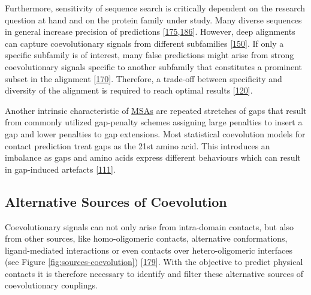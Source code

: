 \documentclass[11pt,a4paper,twoside]{book}
\theoremstyle{definition}
\theoremstyle{definition}
\theoremstyle{remark}
\begin{document}
Furthermore, sensitivity of sequence search is critically dependent on
the research question at hand and on the protein family under study.
Many diverse sequences in general increase precision of predictions
{[}\protect\hyperlink{ref-Ashkenazy2009}{175},\protect\hyperlink{ref-Avila-Herrera2015a}{186}{]}.
However, deep alignments can capture coevolutionary signals from
different subfamilies {[}\protect\hyperlink{ref-Uguzzoni2017}{150}{]}.
If only a specific subfamily is of interest, many false predictions
might arise from strong coevolutionary signals specific to another
subfamily that constitutes a prominent subset in the alignment
{[}\protect\hyperlink{ref-Franceus2016}{170}{]}. Therefore, a trade-off
between specificity and diversity of the alignment is required to reach
optimal results {[}\protect\hyperlink{ref-Hopf2012}{120}{]}.

Another intrinsic characteristic of \protect\hyperlink{abbrev}{MSAs} are
repeated stretches of gaps that result from commonly utilized
gap-penalty schemes assigning large penalties to insert a gap and lower
penalties to gap extensions. Most statistical coevolution models for
contact prediction treat gaps as the 21st amino acid. This introduces an
imbalance as gaps and amino acids express different behaviours which can
result in gap-induced artefacts
{[}\protect\hyperlink{ref-Feinauer2014}{111}{]}.

\subsection{Alternative Sources of
Coevolution}\label{alternative-sources-of-coevolution}

Coevolutionary signals can not only arise from intra-domain contacts,
but also from other sources, like homo-oligomeric contacts, alternative
conformations, ligand-mediated interactions or even contacts over
hetero-oligomeric interfaces (see Figure \ref{fig:sources-coevolution})
{[}\protect\hyperlink{ref-Marks2012}{179}{]}. With the objective to
predict physical contacts it is therefore necessary to identify and
filter these alternative sources of coevolutionary couplings.
\end{document}
